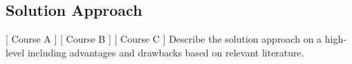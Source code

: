 \subsection{Solution Approach}
[ Course A ] [ Course B ] [ Course C ] 
\newline
[ Author A] [ Author B ] [ Author C ] 
\newline
Describe the solution approach on a high-level including advantages and drawbacks based on relevant literature.
